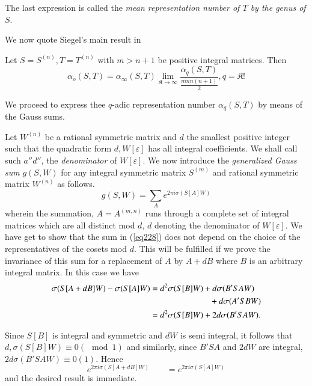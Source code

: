 The last expression is called the \textit{mean representation number
  of $T$ by the genus of } $S$. 

We now quote Siegel's main result in  


\setcounter{thm}{16}
\begin{thm}\label{chap13:thm17}%
 Let $S= S^{(n)}, T=T^{(n)}$ with $m > n + 1$ be positive integral
  matrices. Then 
\begin{equation*}
\alpha_o (S, T) = \alpha_\infty (S, T) \lim_{\mathfrak{K} \to \infty}
\frac{\alpha_q (S, T)}{\frac{mn  n(n + 1)}{2}}, q=\mathfrak{K}!
\tag{227}\label{eq227}  
\end{equation*}

We proceed to express thee $q$-adic representation number $\alpha_q
(S, T)$ by means of the Gauss sums. 
\end{thm}

Let $W^{(n)}$ be a rational symmetric matrix and $d$ the smallest
positive integer such that the quadratic form $d, W[\varepsilon]$ has
all integral coefficients. We shall call such $a'' d''$, the
\textit{denominator } of $W[\varepsilon]$. We now introduce the
\textit{generalized Gauss sum} $g (S, W)$ for any integral symmetric
matrix $S^{(m)}$ and rational symmetric matrix $W^{(n)}$ as follows. 
\begin{equation*}
g(S, W) = \sum_A e^{2 \pi i \sigma (S[A]W)} \tag{228}\label{eq228}
\end{equation*}
where\pageoriginale  in the summation, $A= A^{(m,n)}$ runs through a
complete set of 
integral matrices which are all distinct mod $d$, $d$ denoting the
denominator of $W[\varepsilon]$. We have get to show that the sum in
(\ref{eq228}) does not depend on the choice of the representatives of the
cosets mod $d$. This will be fulfilled if we prove the invariance of
this sum for a replacement of $A$ by $A + d B$ where $B$ is an
arbitrary integral matrix. In this case we have 
\begin{align*}
\sigma (S[A+ dB]W) - \sigma (S[A]W) & = d^2 \sigma (S[B]W) + d \sigma
(B' S A W) \\
& \hspace{2.5cm} + d \sigma (A' S B W)\\ 
& =d^2 \sigma (S[B]W) + 2 d \sigma (B'S A W).
\end{align*}

Since $S[B]$ is integral and symmetric and $d W$ is semi integral, it
follows that $d, \sigma (S[B]W) \equiv 0 (\mod 1)$ and similarly,
since $B' S A$ and $2d W$ are integral, $2 d \sigma (B' S A W) \equiv
0(1)$. Hence  
$$
e^{2 \pi i \sigma (S[A+ d B]W)} \qquad = e^{2 \pi i \sigma (S[A]W)}
$$
and the desired result is immediate.

